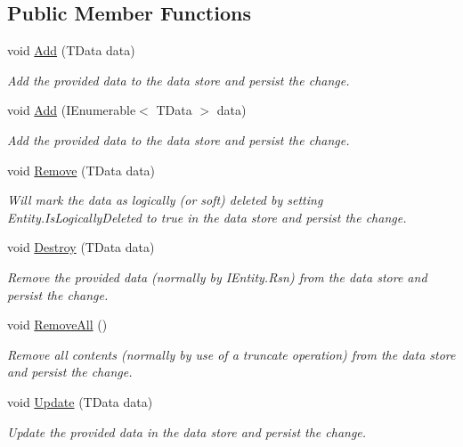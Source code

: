 \subsection*{Public Member Functions}
\begin{DoxyCompactItemize}
\item 
void \hyperlink{interfaceCqrs_1_1DataStores_1_1IDataStore_a114404daaf37fec9cc5547cd9a17858c_a114404daaf37fec9cc5547cd9a17858c}{Add} (T\+Data data)
\begin{DoxyCompactList}\small\item\em Add the provided {\itshape data}  to the data store and persist the change. \end{DoxyCompactList}\item 
void \hyperlink{interfaceCqrs_1_1DataStores_1_1IDataStore_a906f3f2f80db7a549a4170eca4653e26_a906f3f2f80db7a549a4170eca4653e26}{Add} (I\+Enumerable$<$ T\+Data $>$ data)
\begin{DoxyCompactList}\small\item\em Add the provided {\itshape data}  to the data store and persist the change. \end{DoxyCompactList}\item 
void \hyperlink{interfaceCqrs_1_1DataStores_1_1IDataStore_a7ef540796bbe4257296841590bc23478_a7ef540796bbe4257296841590bc23478}{Remove} (T\+Data data)
\begin{DoxyCompactList}\small\item\em Will mark the {\itshape data}  as logically (or soft) deleted by setting Entity.\+Is\+Logically\+Deleted to true in the data store and persist the change. \end{DoxyCompactList}\item 
void \hyperlink{interfaceCqrs_1_1DataStores_1_1IDataStore_aa7ade96f2f3151d5353cf7bdbb2baec5_aa7ade96f2f3151d5353cf7bdbb2baec5}{Destroy} (T\+Data data)
\begin{DoxyCompactList}\small\item\em Remove the provided {\itshape data}  (normally by I\+Entity.\+Rsn) from the data store and persist the change. \end{DoxyCompactList}\item 
void \hyperlink{interfaceCqrs_1_1DataStores_1_1IDataStore_aead8d7a39a717d29af05daf7b64bea94_aead8d7a39a717d29af05daf7b64bea94}{Remove\+All} ()
\begin{DoxyCompactList}\small\item\em Remove all contents (normally by use of a truncate operation) from the data store and persist the change. \end{DoxyCompactList}\item 
void \hyperlink{interfaceCqrs_1_1DataStores_1_1IDataStore_a6d5d4dd572de8db01ff0c48d37faefa7_a6d5d4dd572de8db01ff0c48d37faefa7}{Update} (T\+Data data)
\begin{DoxyCompactList}\small\item\em Update the provided {\itshape data}  in the data store and persist the change. \end{DoxyCompactList}\end{DoxyCompactItemize}


